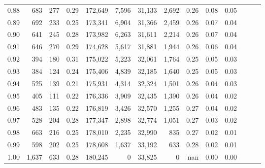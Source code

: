 \begin{tabular}{rrrrrrrrrrrrrr}
0.88 &     683 &    277 &  0.29 &  172,649 &    7,596 &  31,133 &   2,692 &  0.26 &  0.08 &      0.05 \\
0.89 &     692 &    233 &  0.25 &  173,341 &    6,904 &  31,366 &   2,459 &  0.26 &  0.07 &      0.04 \\
0.90 &     641 &    245 &  0.28 &  173,982 &    6,263 &  31,611 &   2,214 &  0.26 &  0.07 &      0.04 \\
0.91 &     646 &    270 &  0.29 &  174,628 &    5,617 &  31,881 &   1,944 &  0.26 &  0.06 &      0.04 \\
0.92 &     394 &    180 &  0.31 &  175,022 &    5,223 &  32,061 &   1,764 &  0.25 &  0.05 &      0.03 \\
0.93 &     384 &    124 &  0.24 &  175,406 &    4,839 &  32,185 &   1,640 &  0.25 &  0.05 &      0.03 \\
0.94 &     525 &    139 &  0.21 &  175,931 &    4,314 &  32,324 &   1,501 &  0.26 &  0.04 &      0.03 \\
0.95 &     405 &    111 &  0.22 &  176,336 &    3,909 &  32,435 &   1,390 &  0.26 &  0.04 &      0.02 \\
0.96 &     483 &    135 &  0.22 &  176,819 &    3,426 &  32,570 &   1,255 &  0.27 &  0.04 &      0.02 \\
0.97 &     528 &    204 &  0.28 &  177,347 &    2,898 &  32,774 &   1,051 &  0.27 &  0.03 &      0.02 \\
0.98 &     663 &    216 &  0.25 &  178,010 &    2,235 &  32,990 &     835 &  0.27 &  0.02 &      0.01 \\
0.99 &     598 &    202 &  0.25 &  178,608 &    1,637 &  33,192 &     633 &  0.28 &  0.02 &      0.01 \\
1.00 &   1,637 &    633 &  0.28 &  180,245 &        0 &  33,825 &       0 &   nan &  0.00 &      0.00 \\
\bottomrule
\end{tabular}
